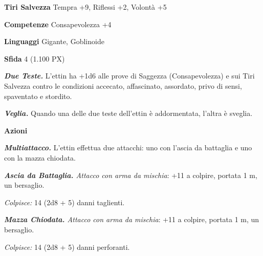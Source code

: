 \begin{multicols}{2}
	\textbf{Tiri Salvezza} Tempra +9, Riflessi +2, Volontà +5

	\textbf{Competenze} Consapevolezza +4

	\textbf{Linguaggi} Gigante, Goblinoide

	\textbf{Sfida} 4 (1.100 PX)

	\textit{\textbf{Due Teste.}} L'ettin ha +1d6 alle prove di Saggezza (Consapevolezza) e sui Tiri Salvezza contro le condizioni accecato, affascinato, assordato, privo di sensi, spaventato e stordito.

	\textit{\textbf{Veglia.}} Quando una delle due teste dell'ettin è addormentata, l'altra è sveglia.

	\textbf{Azioni}

	\textit{\textbf{Multiattacco.}} L'ettin effettua due attacchi: uno con l'ascia da battaglia e uno con la mazza chiodata.

	\textit{\textbf{Ascia da Battaglia.} Attacco con arma da mischia}: +11 a colpire, portata 1 m, un bersaglio.

	\textit{Colpisce:} 14 (2d8 + 5) danni taglienti.

	\textit{\textbf{Mazza Chiodata.} Attacco con arma da mischia}: +11 a colpire, portata 1 m, un bersaglio.

	\textit{Colpisce:} 14 (2d8 + 5) danni perforanti.


\end{multicols}
